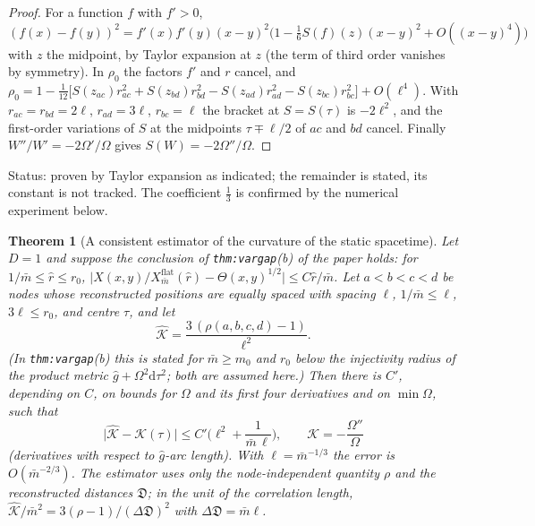 \documentclass[a4paper,11pt]{article}
\newtheorem{theorem}{Theorem}[section]
\theoremstyle{definition}
\theoremstyle{remark}
\newcommand{\dd}{\mathrm{d}}
\newcommand{\status}[1]{\par\noindent\textsf{\small Status: #1}\par}
\begin{document}
\begin{proof}
For a function $f$ with $f'>0$, $(f(x)-f(y))^2=f'(x)f'(y)(x-y)^2\big(1-\tfrac16S(f)(z)(x-y)^2+O((x-y)^4)\big)$ with $z$ the midpoint, by Taylor expansion at $z$ (the term of third order vanishes by symmetry). In $\rho_0$ the factors $f'$ and $r$ cancel, and
$\rho_0=1-\tfrac1{12}\big[S(z_{ac})r_{ac}^2+S(z_{bd})r_{bd}^2-S(z_{ad})r_{ad}^2-S(z_{bc})r_{bc}^2\big]+O(\ell^4)$. With $r_{ac}=r_{bd}=2\ell$, $r_{ad}=3\ell$, $r_{bc}=\ell$ the bracket at $S=S(\tau)$ is $-2\ell^2$, and the first-order variations of $S$ at the midpoints $\tau\mp\ell/2$ of $ac$ and $bd$ cancel. Finally $W''/W'=-2\Omega'/\Omega$ gives $S(W)=-2\Omega''/\Omega$.
\end{proof}
\status{proven by Taylor expansion as indicated; the remainder is stated, its constant is not tracked. The coefficient $\tfrac13$ is confirmed by the numerical experiment below.}

\begin{theorem}[A consistent estimator of the curvature of the static spacetime]\label{thm:lapse-est}
Let $D=1$ and suppose the conclusion of \texttt{thm:vargap}(b) of the paper holds: for $1/\bar m\le\hat r\le r_0$, $\big|X(x,y)/X^{\mathrm{flat}}_{\bar m}(\hat r)-\Theta(x,y)^{1/2}\big|\le C\hat r/\bar m$. Let $a<b<c<d$ be nodes whose reconstructed positions are equally spaced with spacing $\ell$, $1/\bar m\le\ell$, $3\ell\le r_0$, and centre $\tau$, and let
\[
\hat{\mathcal K}=\frac{3\,(\rho(a,b,c,d)-1)}{\ell^2} .
\]
(In \texttt{thm:vargap}(b) this is stated for $\bar m\ge m_0$ and $r_0$ below the injectivity radius of the product metric $\hat g+\Omega^2\dd\tau^2$; both are assumed here.) Then there is $C'$, depending on $C$, on bounds for $\Omega$ and its first four derivatives and on $\min\Omega$, such that
\[
\big|\hat{\mathcal K}-\mathcal K(\tau)\big|\le C'\Big(\ell^2+\frac1{\bar m\,\ell}\Big),\qquad\mathcal K=-\frac{\Omega''}{\Omega}
\]
(derivatives with respect to $\hat g$-arc length). With $\ell=\bar m^{-1/3}$ the error is $O(\bar m^{-2/3})$. The estimator uses only the node-independent quantity $\rho$ and the reconstructed distances $\mathfrak D$; in the unit of the correlation length, $\hat{\mathcal K}/\bar m^2=3(\rho-1)/(\Delta\mathfrak D)^2$ with $\Delta\mathfrak D=\bar m\ell$.
\end{theorem}
\end{document}

